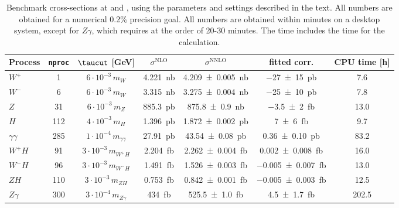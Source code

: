 \begin{table}[]
	\caption{Benchmark cross-sections at \NLO{} and \NNLO{}, using the parameters
		and settings described in the text. All numbers are obtained for a numerical 0.2\% precision goal.
	All \NLO{} numbers are obtained within minutes on a desktop system, except for $Z\gamma$, which requires at the 
	order of 20-30 minutes. The \NNLO{} \CPU{} time includes the time for the \NLO{} calculation.}
	\label{NNLObenchmarks} 
	\vspace{0.5em}
	\begin{tabular}{@{}lcccccc@{}}
		\toprule
		Process & \texttt{nproc} & $\taucut$ [GeV] & $\sigma^\text{NLO}$ & 
		$\sigma^\text{NNLO}$ & fitted corr. & CPU time [h] \\ \midrule 
		$W^+$ &  1 &   $6\cdot10^{-3}\, m_W$  &  \SI{4.221}{nb} & \SI{4.209\pm0.005}{nb} & \SI{-27\pm15}{pb}  & 7.6 
		\\           
		$W^-$ &  6 &   $6\cdot10^{-3}\, m_W$ & \SI{3.315}{nb} & \SI{3.275\pm0.004}{nb} & \SI{-25\pm10}{pb} & 7.8 \\
		$Z$   &  31 &   $6\cdot10^{-3}\, m_Z$ & \SI{885.3}{pb} & \SI{875.8\pm0.9}{nb} & \SI{-3.5\pm 2}{fb} & 13.0 \\
		$H$   &  112 &   $4\cdot10^{-3}\, m_H$ & \SI{1.396}{pb} & \SI{1.872\pm0.002}{pb} & \SI{7\pm6}{fb} & 9.7 \\
		$\gamma\gamma$   &  285 &   $1\cdot10^{-4}\, m_{\gamma\gamma}$ & \SI{27.91}{pb} & \SI{43.54\pm0.08}{pb} & 
		\SI{0.36\pm0.10}{pb} & 83.2 \\
		$W^+ H$   &  91 &   $3\cdot10^{-3}\, m_{W^+ H}$ & \SI{2.204}{fb} & \SI{2.262\pm0.004}{fb} & 
		\SI{0.002\pm0.008}{fb} & 16.0 \\
		$W^- H$   &  96 &   $3\cdot10^{-3}\, m_{W^- H}$ & \SI{1.491}{fb} & \SI{1.526\pm0.003}{fb} & 
		\SI{-0.005\pm0.007}{fb} & 13.0 \\
		$Z H$   &  110 &   $3\cdot10^{-3}\, m_{Z H}$ & \SI{0.753}{fb} & \SI{0.842\pm0.001}{fb} & 
		\SI{-0.005\pm0.003}{fb} & 12.5 \\
		$Z \gamma$   &  300 &   $3\cdot10^{-4}\, m_{Z \gamma}$ & \SI{434}{fb} & \SI{525.5\pm1.0}{fb} & 
		\SI{4.5\pm1.7}{fb} & 202.5 \\
	 \bottomrule
	\end{tabular}
\end{table}

